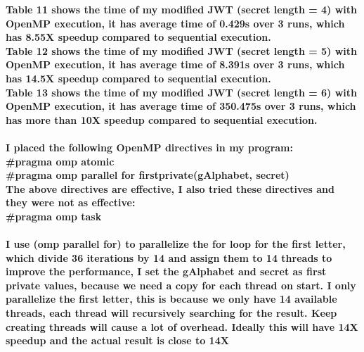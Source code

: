 \documentclass[12pt]{article}
\begin{document}
{\bf Table 11 shows the time of my modified JWT (secret length = 4) with OpenMP execution, it has average time of 0.429s over 3 runs, which has 8.55X speedup compared to sequential execution.
}
\\
{\bf Table 12 shows the time of my modified JWT (secret length = 5) with OpenMP execution, it has average time of 8.391s over 3 runs, which has 14.5X speedup compared to sequential execution.
}
\\
{\bf Table 13 shows the time of my modified JWT (secret length = 6) with OpenMP execution, it has average time of 350.475s over 3 runs, which has more than 10X speedup compared to sequential execution.\\
}
\\
{\bf I placed the following OpenMP directives in my program:\\
#pragma omp atomic\\
#pragma omp parallel for firstprivate(gAlphabet, secret)\\
The above directives are effective, I also tried these directives and they were not as effective:\\
#pragma omp task\\
}
\\
{\bf I use (omp parallel for) to parallelize the for loop for the first letter, which divide 36 iterations by 14 and assign them to 14 threads to improve the performance, I set the gAlphabet and secret as first private values, because we need a copy for each thread on start. I only parallelize the first letter, this is because we only have 14 available threads, each thread will recursively searching for the result. Keep creating threads will cause a lot of overhead. Ideally this will have 14X speedup and the actual result is close to 14X}
\end{document}
